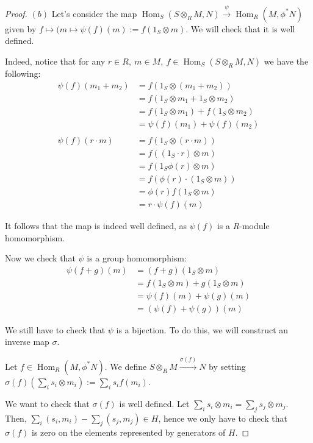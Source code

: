 \documentclass{article}
\DeclareMathOperator{\Hom}{Hom}
\begin{document}
\begin{proof}
	$(b)$ Let's consider the map $\Hom_S(S\otimes_R M,N)\xrightarrow{\psi}\Hom_R(M,\phi^*N)$ given by $f\mapsto (m\mapsto \psi(f)(m):=f(1_S\otimes m)$. We will check that it is well defined.
	
	Indeed, notice that for any $r\in R,\ m\in M,\ f\in\Hom_S(S\otimes_R M,N)$ we have the following:
	\begin{align*}
		\psi(f)(m_1+m_2) &=f(1_S\otimes (m_1+m_2)) \\
		&=f(1_S\otimes m_1+1_S\otimes m_2) \\
		&=f(1_S\otimes m_1)+f(1_S\otimes m_2) \\
		&=\psi(f)(m_1)+\psi(f)(m_2) \\
		\\
		\psi(f)(r\cdot m) &=f(1_S\otimes (r\cdot m)) \\
		&=f((1_S\cdot r)\otimes m) \\
		&=f(1_S\phi(r)\otimes m) \\
		&=f(\phi(r)\cdot (1_S\otimes m)) \\
		&=\phi(r) f(1_S\otimes m) \\
		&=r\cdot\psi(f)(m)
	\end{align*}
	
	It follows that the map is indeed well defined, as $\psi(f)$ is a $R$-module homomorphism.
	
	Now we check that $\psi$ is a group homomorphism:
	\begin{align*}
		\psi(f+g)(m) &=(f+g)(1_S\otimes m) \\
		&=f(1_S\otimes m)+g(1_S\otimes m) \\
		&=\psi(f)(m)+\psi(g)(m) \\
		&=(\psi(f)+\psi(g))(m)
	\end{align*}
	
	We still have to check that $\psi$ is a bijection. To do this, we will construct an inverse map $\sigma$.
	
	Let $f\in\Hom_R(M,\phi^*N)$. We define $S\otimes_R M\xrightarrow{\sigma(f)} N$ by setting $\sigma(f)(\sum_i s_i\otimes m_i):=\sum_i s_if(m_i)$.
	
	We want to check that $\sigma(f)$ is well defined. Let $\sum_i
        s_i\otimes m_i=\sum_j s_j\otimes m_j$. Then, $\sum_i (s_i,m_i)-\sum_j
        (s_j,m_j)\in H$, hence we only have to check that $\sigma(f)$ is zero on the
        elements represented by generators of $H$.
	

\end{proof}
\end{document}
